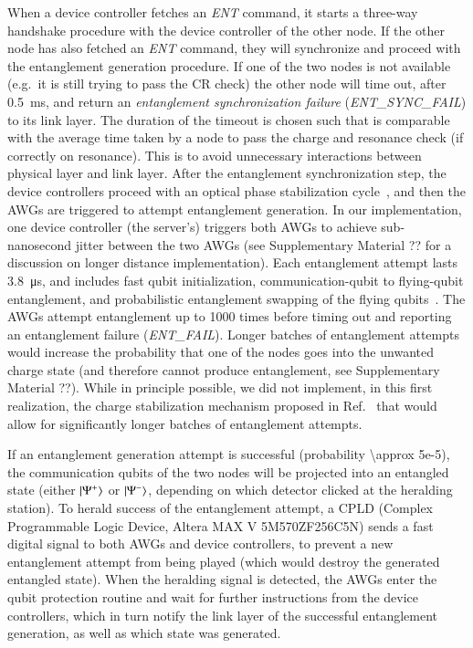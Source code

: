 When a device controller fetches an \emph{ENT} command, it starts a three-way handshake procedure
with the device controller of the other node. If the other node has also fetched an \emph{ENT}
command, they will synchronize and proceed with the entanglement generation procedure. If one of the
two nodes is not available (e.g.~it is still trying to pass the CR check) the other node will time
out, after \qty{0.5}{\ms}, and return an \emph{entanglement synchronization failure}
(\emph{ENT\_SYNC\_FAIL}) to its link layer. The duration of the timeout is chosen such that is
comparable with the average time taken by a node to pass the charge and resonance check (if
correctly on resonance). This is to avoid unnecessary interactions between physical layer and link
layer. After the entanglement synchronization step, the device controllers proceed with an optical
phase stabilization cycle~\cite{pompili_2021_multinode}, and then the AWGs are triggered to attempt
entanglement generation. In our implementation, one device controller (the server's) triggers both
AWGs to achieve sub-nanosecond jitter between the two AWGs (see Supplementary Material ?? for a
discussion on longer distance implementation). Each entanglement attempt lasts \qty{3.8}{\us}, and
includes fast qubit initialization, communication-qubit to flying-qubit entanglement, and
probabilistic entanglement swapping of the flying qubits~\cite{pompili_2021_multinode}. The AWGs
attempt entanglement up to \num{1000} times before timing out and reporting an {entanglement
failure} (\emph{ENT\_FAIL}). Longer batches of entanglement attempts would increase the probability
that one of the nodes goes into the unwanted charge state (and therefore cannot produce
entanglement, see Supplementary Material ??). While in principle possible, we did not implement, in
this first realization, the charge stabilization mechanism proposed in
Ref.~\cite{humphreys_2018_delivery} that would allow for significantly longer batches of
entanglement attempts.

If an entanglement generation attempt is successful (probability \num{\approx 5e-5}), the
communication qubits of the two nodes will be projected into an entangled state (either
$\ket{\Psi^+}$ or $\ket{\Psi^-}$, depending on which detector clicked at the heralding station). To
herald success of the entanglement attempt, a CPLD (Complex Programmable Logic Device, Altera MAX V
5M570ZF256C5N) sends a fast digital signal to both AWGs and device controllers, to prevent a new
entanglement attempt from being played (which would destroy the generated entangled state). When the
heralding signal is detected, the AWGs enter the qubit protection routine and wait for further
instructions from the device controllers, which in turn notify the link layer of the successful
entanglement generation, as well as which state was generated.

